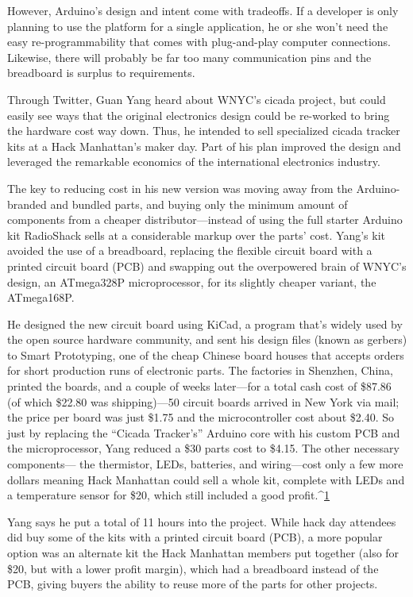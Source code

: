 However, Arduino's design and intent come with tradeoffs. If a developer is
only planning to use the platform for a single application, he or she won't
need the easy re-programmability that comes with plug-and-play computer
connections. Likewise, there will probably be far too many communication
pins and the breadboard is surplus to requirements.

Through Twitter, Guan Yang heard about WNYC's cicada project, but could
easily see ways that the original electronics design could be re-worked
to bring the hardware cost way down. Thus, he intended to sell specialized
cicada tracker kits at a Hack Manhattan's maker day. Part of his plan
improved the design and leveraged the remarkable economics of the international
electronics industry.

The key to reducing cost in his new version was moving away from the
Arduino-branded and bundled parts, and buying only the minimum
amount of components from a cheaper distributor—instead of using the
full starter Arduino kit RadioShack sells at a considerable markup over the
parts' cost. Yang's kit avoided the use of a breadboard, replacing the flexible circuit board with a printed circuit board (PCB) and swapping out the overpowered
brain of WNYC's design, an ATmega328P microprocessor, for its
slightly cheaper variant, the ATmega168P.

He designed the new circuit board using KiCad, a program that's widely
used by the open source hardware community, and sent his design files
(known as gerbers) to Smart Prototyping, one of the cheap Chinese board
houses that accepts orders for short production runs of electronic parts.
The factories in Shenzhen, China, printed the boards, and a couple of weeks
later—for a total cash cost of \$87.86 (of which \$22.80 was shipping)—50
circuit boards arrived in New York via mail; the price per board was just
\$1.75 and the microcontroller cost about \$2.40. So just by replacing the
``Cicada Tracker's'' Arduino core with his custom PCB and the microprocessor,
Yang reduced a \$30 parts cost to \$4.15. The other necessary components—
the thermistor, LEDs, batteries, and wiring—cost only a few more
dollars meaning Hack Manhattan could sell a whole kit, complete with
LEDs and a temperature sensor for \$20, which still included a good profit.^{\href{#endnotes-wnyc}{1}}

Yang says he put a total of 11 hours into the project. While hack day attendees
did buy some of the kits with a printed circuit board (PCB), a more popular option was an
alternate kit the Hack Manhattan members put together (also for \$20, but
with a lower profit margin), which had a breadboard instead of the PCB,
giving buyers the ability to reuse more of the parts for other projects.

